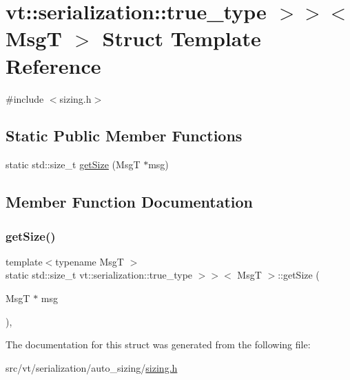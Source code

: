 \hypertarget{structvt_1_1serialization_1_1_size_3_01_msg_t_00_01typename_01std_1_1enable__if__t_3_01std_1_1true__type_01_4_4}{}\section{vt\+:\+:serialization\+:\+:true\+\_\+type $>$$>$$<$ MsgT $>$ Struct Template Reference}
\label{structvt_1_1serialization_1_1_size_3_01_msg_t_00_01typename_01std_1_1enable__if__t_3_01std_1_1true__type_01_4_4}


{\ttfamily \#include $<$sizing.\+h$>$}

\subsection*{Static Public Member Functions}
\begin{DoxyCompactItemize}
\item 
static std\+::size\+\_\+t \hyperlink{structvt_1_1serialization_1_1_size_3_01_msg_t_00_01typename_01std_1_1enable__if__t_3_01std_1_1true__type_01_4_4_a60dfa3b237a08133a7f13fbdf9cc6dd1}{get\+Size} (MsgT $\ast$msg)
\end{DoxyCompactItemize}


\subsection{Member Function Documentation}
\mbox{\label{structvt_1_1serialization_1_1_size_3_01_msg_t_00_01typename_01std_1_1enable__if__t_3_01std_1_1true__type_01_4_4_a60dfa3b237a08133a7f13fbdf9cc6dd1}} 
\subsubsection{\texorpdfstring{get\+Size()}{getSize()}}
{\footnotesize\ttfamily template$<$typename MsgT $>$ \\
static std\+::size\+\_\+t vt\+::serialization\+::true\+\_\+type $>$$>$$<$ MsgT $>$\+::get\+Size (\begin{DoxyParamCaption}\item[{MsgT $\ast$}]{msg }\end{DoxyParamCaption})\hspace{0.3cm}{\ttfamily [inline]}, {\ttfamily [static]}}



The documentation for this struct was generated from the following file\+:\begin{DoxyCompactItemize}
\item 
src/vt/serialization/auto\+\_\+sizing/\hyperlink{sizing_8h}{sizing.\+h}\end{DoxyCompactItemize}
